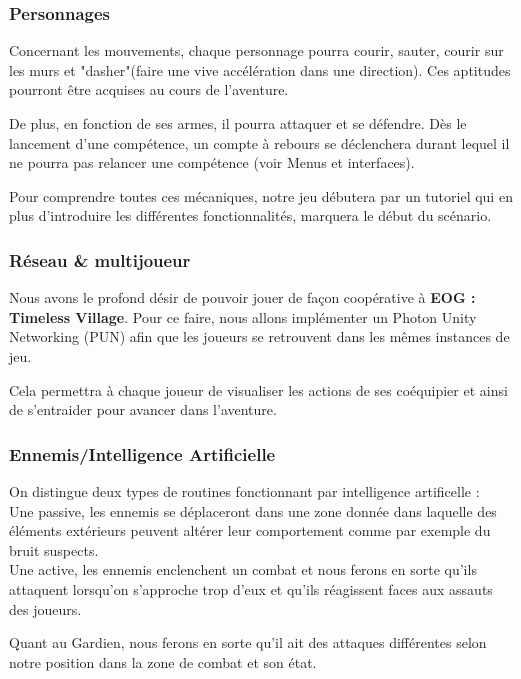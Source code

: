 \documentclass[12pt]{article}
\begin{document}
            \subsubsection{Personnages}
                
                Concernant les mouvements, chaque personnage pourra courir, sauter, courir sur les murs et "dasher"(faire une vive accélération dans une direction). Ces aptitudes pourront être acquises au cours de l'aventure.
                \par De plus, en fonction de ses armes, il pourra attaquer et se défendre.
                Dès le lancement d'une compétence, un compte à rebours se déclenchera durant lequel il ne pourra pas relancer une compétence (voir Menus et interfaces).
                \\
                \par Pour comprendre toutes ces mécaniques, notre jeu débutera par un tutoriel qui en plus d'introduire les différentes fonctionnalités, marquera le début du scénario.
                
            \subsubsection{Réseau \& multijoueur}
                Nous avons le profond désir de pouvoir jouer de façon coopérative à \textbf{EOG : Timeless Village}. Pour ce faire, nous allons implémenter un Photon Unity Networking (PUN) afin que les joueurs se retrouvent dans les mêmes instances de jeu.
                
                \par Cela permettra à chaque joueur de visualiser les actions de ses coéquipier et ainsi de s'entraider pour avancer dans l'aventure.
            
            \subsubsection{Ennemis/Intelligence Artificielle}
                On distingue deux types de routines fonctionnant par intelligence artificelle :
                    \\ Une passive, les ennemis se déplaceront dans une zone donnée dans laquelle des éléments extérieurs peuvent altérer leur comportement comme par exemple du bruit suspects.
                    \\ Une active, les ennemis enclenchent un combat et nous ferons en sorte qu'ils attaquent lorsqu'on s'approche trop d'eux et qu'ils réagissent faces aux assauts des joueurs.
                \\
                \par Quant au Gardien, nous ferons en sorte qu'il ait des attaques différentes selon notre position dans la zone de combat et son état.
        \clearpage
\end{document}
